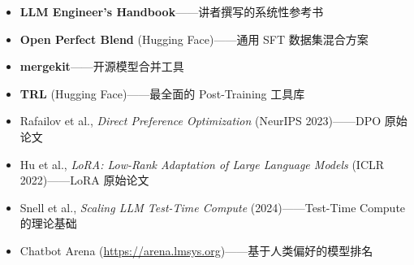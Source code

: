 \documentclass[a4paper]{article}
\begin{document}
\begin{itemize}
    \item \textbf{LLM Engineer's Handbook}——讲者撰写的系统性参考书
    \item \textbf{Open Perfect Blend} (Hugging Face)——通用 SFT 数据集混合方案
    \item \textbf{mergekit}——开源模型合并工具
    \item \textbf{TRL} (Hugging Face)——最全面的 Post-Training 工具库
    \item Rafailov et al., \textit{Direct Preference Optimization} (NeurIPS 2023)——DPO 原始论文
    \item Hu et al., \textit{LoRA: Low-Rank Adaptation of Large Language Models} (ICLR 2022)——LoRA 原始论文
    \item Snell et al., \textit{Scaling LLM Test-Time Compute} (2024)——Test-Time Compute 的理论基础
    \item Chatbot Arena (\url{https://arena.lmsys.org})——基于人类偏好的模型排名
\end{itemize}

\end{document}
